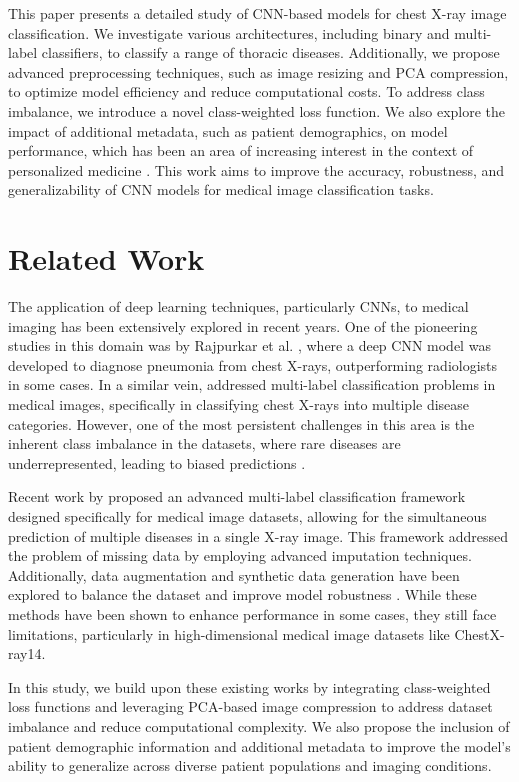 \documentclass[conference]{IEEEtran}
\begin{document}
This paper presents a detailed study of CNN-based models for chest X-ray image classification. We investigate various architectures, including binary and multi-label classifiers, to classify a range of thoracic diseases. Additionally, we propose advanced preprocessing techniques, such as image resizing and PCA compression, to optimize model efficiency and reduce computational costs. To address class imbalance, we introduce a novel class-weighted loss function. We also explore the impact of additional metadata, such as patient demographics, on model performance, which has been an area of increasing interest in the context of personalized medicine \cite{gao2018deep}. This work aims to improve the accuracy, robustness, and generalizability of CNN models for medical image classification tasks.

\section{Related Work}
The application of deep learning techniques, particularly CNNs, to medical imaging has been extensively explored in recent years. One of the pioneering studies in this domain was by Rajpurkar et al. \cite{rajpurkar2017chexnet}, where a deep CNN model was developed to diagnose pneumonia from chest X-rays, outperforming radiologists in some cases. In a similar vein, \cite{sethi2018chestx} addressed multi-label classification problems in medical images, specifically in classifying chest X-rays into multiple disease categories. However, one of the most persistent challenges in this area is the inherent class imbalance in the datasets, where rare diseases are underrepresented, leading to biased predictions \cite{johnson2019survey}.

Recent work by \cite{luo2017multi} proposed an advanced multi-label classification framework designed specifically for medical image datasets, allowing for the simultaneous prediction of multiple diseases in a single X-ray image. This framework addressed the problem of missing data by employing advanced imputation techniques. Additionally, data augmentation and synthetic data generation have been explored to balance the dataset and improve model robustness \cite{shorten2019survey}. While these methods have been shown to enhance performance in some cases, they still face limitations, particularly in high-dimensional medical image datasets like ChestX-ray14.

In this study, we build upon these existing works by integrating class-weighted loss functions and leveraging PCA-based image compression to address dataset imbalance and reduce computational complexity. We also propose the inclusion of patient demographic information and additional metadata to improve the model's ability to generalize across diverse patient populations and imaging conditions.
\end{document}
